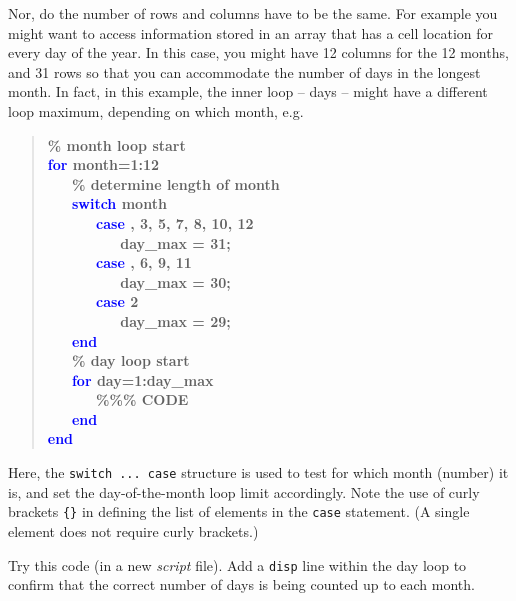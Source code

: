 \documentclass{tufte-book} %
\newenvironment{docspecbold}{\begin{quotation}\ttfamily\bfseries\parskip0pt\parindent0pt\ignorespaces}{\end{quotation}}
\begin{document}
Nor, do the number of rows and columns have to be the same. For example you might want to access information stored in an array that has a cell location for every day of the year. In this case, you might have 12 columns for the 12 months, and 31 rows so that you can accommodate the number of days in the longest month. In fact, in this example, the inner loop -- days -- might have a different loop maximum, depending on which month, e.g.
\begin{docspecbold}
\textcolor[rgb]{0,0.501961,0}{\% month loop start\\}
\textcolor{blue}{for} month=1:12\\
\ \ \ \textcolor[rgb]{0,0.501961,0}{\% determine length of month\\}
\ \ \ \textcolor{blue}{switch} month\\
\ \ \ \ \ \     \textcolor{blue}{case} {, 3, 5, 7, 8, 10, 12\textbraceright}\\
\ \ \ \ \ \ \ \ \         day\_max = 31;\\
\ \ \ \ \ \     \textcolor{blue}{case} {, 6, 9, 11\textbraceright}\\
\ \ \ \ \ \ \ \ \         day\_max = 30;\\
\ \ \ \ \ \     \textcolor{blue}{case} {2}\\
\ \ \ \ \ \ \ \ \         day\_max = 29;\\
\ \ \ \textcolor{blue}{end}\\
\ \ \ \textcolor[rgb]{0,0.501961,0}{\% day loop start\\}
\ \ \ \textcolor{blue}{for} day=1:day\_max\\
\ \ \ \ \ \ \textcolor[rgb]{0,0.501961,0}{\%\%\% CODE\\}
\ \ \ \textcolor{blue}{end}\\
\textcolor{blue}{end}
\end{docspecbold}
Here, the \texttt{switch ... case} structure is used to test for which month (number) it is, and set the day-of-the-month loop limit accordingly.
Note the use of curly brackets \texttt{\{\}} in defining the list of elements in the \texttt{case} statement. (A single element does not require curly brackets.)

Try this code (in a new \textit{script} file). Add a \texttt{disp} line within the day loop to confirm that the correct number of days is being counted up to each month.
\end{document}
